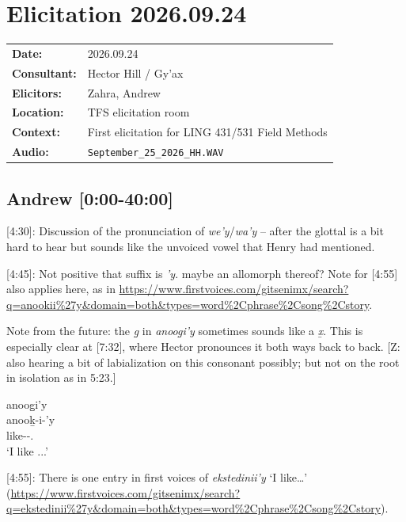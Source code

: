 \renewcommand{\ElicitationDate}{2026.09.24}

\section{Elicitation \ElicitationDate}

\begin{tabular}{ll}
\textbf{Date:} & \ElicitationDate \\
\textbf{Consultant:} & Hector Hill / Gy'ax \\
\textbf{Elicitors:} & Zahra, Andrew \\
\textbf{Location:} & TFS elicitation room \\
\textbf{Context:} & First elicitation for LING 431/531 Field Methods \\
\textbf{Audio:} & \texttt{September\_25\_2026\_HH.WAV} \\
\end{tabular}

\subsection{Andrew [0:00-40:00]}

[4:30]: Discussion of the pronunciation of \textit{we'y}/\textit{wa'y} -- after the glottal is a bit hard to hear but sounds like the unvoiced vowel that Henry had mentioned. 

[4:45]: Not positive that suffix is \textit{'y}. maybe an allomorph thereof? Note for [4:55] also applies here, as in \url{https://www.firstvoices.com/gitsenimx/search?q=anookii%27y&domain=both&types=word%2Cphrase%2Csong%2Cstory}.

Note from the future: the \textit{g̱} in \textit{anoog̱i'y} sometimes sounds like a \textit{x̱}. This is especially clear at [7:32], where Hector pronounces it both ways back to back. [Z: also hearing a bit of labialization on this consonant possibly; but not on the root in isolation as in 5:23.] 

\begin{exe}
    \ex \glll anoog̱i'y \\
    anooḵ-i-'y \\
    like-\Tr{}-\Fsg.\Ii{} \\
    `I like ...'
\end{exe}

[4:55]: There is one entry in first voices of \textit{ekstedinii'y} `I like\dots' (\url{https://www.firstvoices.com/gitsenimx/search?q=ekstedinii%27y&domain=both&types=word%2Cphrase%2Csong%2Cstory}). 

